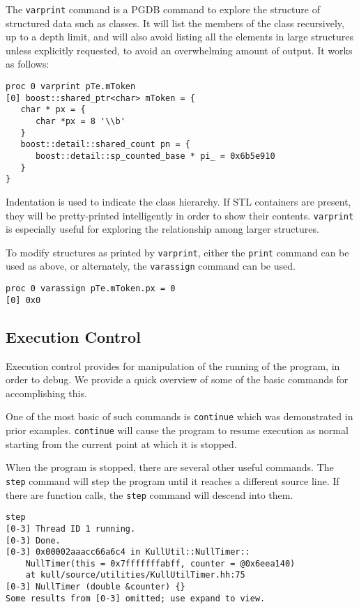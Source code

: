 \documentclass{refart}
\begin{document}
The \texttt{varprint} command is a PGDB command to explore the structure of structured data such as classes. It will list the members of the class recursively, up to a depth limit, and will also avoid listing all the elements in large structures unless explicitly requested, to avoid an overwhelming amount of output. It works as follows:

\begin{Verbatim}
proc 0 varprint pTe.mToken
[0] boost::shared_ptr<char> mToken = {
   char * px = {
      char *px = 8 '\\b'
   }
   boost::detail::shared_count pn = {
      boost::detail::sp_counted_base * pi_ = 0x6b5e910
   }
}
\end{Verbatim}

Indentation is used to indicate the class hierarchy. If STL containers are present, they will be pretty-printed intelligently in order to show their contents. \texttt{varprint} is especially useful for exploring the relationship among larger structures.

To modify structures as printed by \texttt{varprint}, either the \texttt{print} command can be used as above, or alternately, the \texttt{varassign} command can be used.

\begin{Verbatim}
proc 0 varassign pTe.mToken.px = 0
[0] 0x0
\end{Verbatim}

\subsection{Execution Control}

Execution control provides for manipulation of the running of the program, in order to debug. We provide a quick overview of some of the basic commands for accomplishing this.

One of the most basic of such commands is \texttt{continue} which was demonstrated in prior examples. \texttt{continue} will cause the program to resume execution as normal starting from the current point at which it is stopped.

When the program is stopped, there are several other useful commands. The \texttt{step} command will step the program until it reaches a different source line. If there are function calls, the \texttt{step} command will descend into them.

\begin{Verbatim}
step
[0-3] Thread ID 1 running.
[0-3] Done.
[0-3] 0x00002aaacc66a6c4 in KullUtil::NullTimer::
    NullTimer(this = 0x7fffffffabff, counter = @0x6eea140)
    at kull/source/utilities/KullUtilTimer.hh:75
[0-3] NullTimer (double &counter) {}
Some results from [0-3] omitted; use expand to view.
\end{Verbatim}
\end{document}
